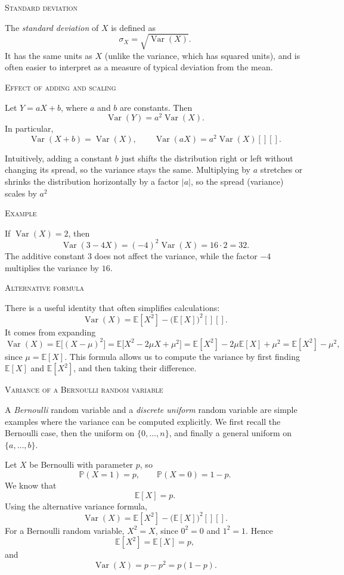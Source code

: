 \bigskip\textsc{Standard deviation}

The \textit{standard deviation} of \(X\) is defined as
\[
\sigma_X = \sqrt{\operatorname{Var}(X)}.
\]
It has the same units as \(X\) (unlike the variance, which has squared units), and is often easier to interpret as a measure of typical deviation from the mean. 

\bigskip\textsc{Effect of adding and scaling}

Let \(Y = aX + b\), where \(a\) and \(b\) are constants.  
Then
\[
\operatorname{Var}(Y) = a^2 \operatorname{Var}(X).
\]
In particular,
\[
\operatorname{Var}(X + b) = \operatorname{Var}(X), \qquad
\operatorname{Var}(aX) = a^2 \operatorname{Var}(X) [][].
\]

Intuitively, adding a constant \(b\) just shifts the distribution right or left without changing its spread, so the variance stays the same.  
Multiplying by \(a\) stretches or shrinks the distribution horizontally by a factor \(|a|\), so the spread (variance) scales by \(a^2\)  

\bigskip\textsc{Example}

If \(\operatorname{Var}(X) = 2\), then
\[
\operatorname{Var}(3 - 4X) = (-4)^2 \operatorname{Var}(X) = 16 \cdot 2 = 32.
\]
The additive constant \(3\) does not affect the variance, while the factor \(-4\) multiplies the variance by \(16\).

\bigskip\textsc{Alternative formula}

There is a useful identity that often simplifies calculations:
\[
\operatorname{Var}(X) = \mathbb{E}[X^2] - \bigl(\mathbb{E}[X]\bigr)^2 [][].
\]
It comes from expanding
\[
\operatorname{Var}(X)
= \mathbb{E}\bigl[(X - \mu)^2\bigr]
= \mathbb{E}\bigl[X^2 - 2\mu X + \mu^2\bigr]
= \mathbb{E}[X^2] - 2\mu \mathbb{E}[X] + \mu^2
= \mathbb{E}[X^2] - \mu^2,
\]
since \(\mu = \mathbb{E}[X]\).  
This formula allows us to compute the variance by first finding \(\mathbb{E}[X]\) and \(\mathbb{E}[X^2]\), and then taking their difference.




\bigskip\textsc{Variance of a Bernoulli random variable}

A \textit{Bernoulli} random variable and a \textit{discrete uniform} random variable are simple examples where the variance can be computed explicitly.  
We first recall the Bernoulli case, then the uniform on \(\{0,\dots,n\}\), and finally a general uniform on \(\{a,\dots,b\}\). 

Let \(X\) be Bernoulli with parameter \(p\), so
\[
\mathbb{P}(X=1) = p, \qquad \mathbb{P}(X=0) = 1-p.
\]
We know that
\[
\mathbb{E}[X] = p.
\]
Using the alternative variance formula,
\[
\operatorname{Var}(X) = \mathbb{E}[X^2] - \bigl(\mathbb{E}[X]\bigr)^2 [][].
\]
For a Bernoulli random variable, \(X^2 = X\), since \(0^2=0\) and \(1^2=1\).  
Hence
\[
\mathbb{E}[X^2] = \mathbb{E}[X] = p,
\]
and
\[
\operatorname{Var}(X) = p - p^2 = p(1-p).
\]

